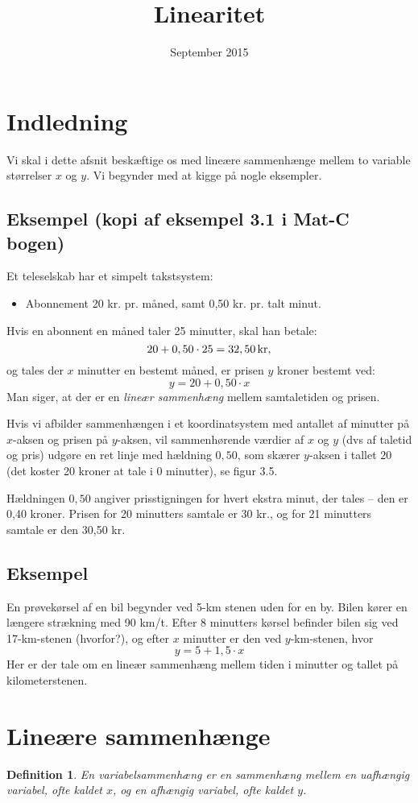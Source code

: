 \documentclass[12pt,oneside,a4paper]{article}
\title{Linearitet}
\date{September 2015}
\newtheorem{mydef}[thm]{Definition}
\begin{document}
\maketitle

\section{Indledning}
Vi skal i dette afsnit beskæftige os med lineære sammenhænge mellem to variable
størrelser $x$ og $y$.  Vi begynder med at kigge på nogle eksempler.

\subsection{Eksempel (kopi af eksempel 3.1 i Mat-C bogen)}
Et teleselskab har et simpelt takstsystem:
\begin{itemize}
    \item Abonnement 20 kr. pr. måned, samt 0,50 kr. pr. talt minut.
\end{itemize}
Hvis en abonnent en måned taler 25 minutter, skal han betale:
$$
20 + 0,50\cdot25 = 32,50 \, {\rm kr},
$$
og tales der $x$ minutter en bestemt måned, er prisen $y$ kroner bestemt ved:
$$
y = 20 + 0,50\cdot x
$$
Man siger, at der er en {\em lineær sammenhæng} mellem samtaletiden og prisen.

Hvis vi afbilder sammenhængen i et koordinatsystem med antallet af minutter på
$x$-aksen og prisen på $y$-aksen, vil sammenhørende værdier af $x$ og $y$ (dvs
af taletid og pris) udgøre en ret linje med hældning $0,50$, som skærer
$y$-aksen i tallet $20$ (det koster 20 kroner at tale i 0 minutter), se figur
3.5.

Hældningen $0,50$ angiver prisstigningen for hvert ekstra minut, der tales --
den er 0,40 kroner.  Prisen for 20 minutters samtale er 30 kr., og for 21
minutters samtale er den 30,50 kr.

\subsection{Eksempel}
En prøvekørsel af en bil begynder ved 5-km stenen uden for en by. Bilen kører
en længere strækning med 90 km/t. Efter 8 minutters kørsel befinder bilen sig
ved 17-km-stenen (hvorfor?), og efter $x$ minutter er den ved $y$-km-stenen,
hvor
$$
y = 5 + 1,5\cdot x
$$
Her er der tale om en lineær sammenhæng mellem tiden i minutter og tallet på
kilometerstenen.

\section{Lineære sammenhænge}
\begin{mydef}
    En variabelsammenhæng er en sammenhæng mellem en uafhængig variabel, ofte
    kaldet $x$, og en afhængig variabel, ofte kaldet $y$.
\end{mydef}
\end{document}
